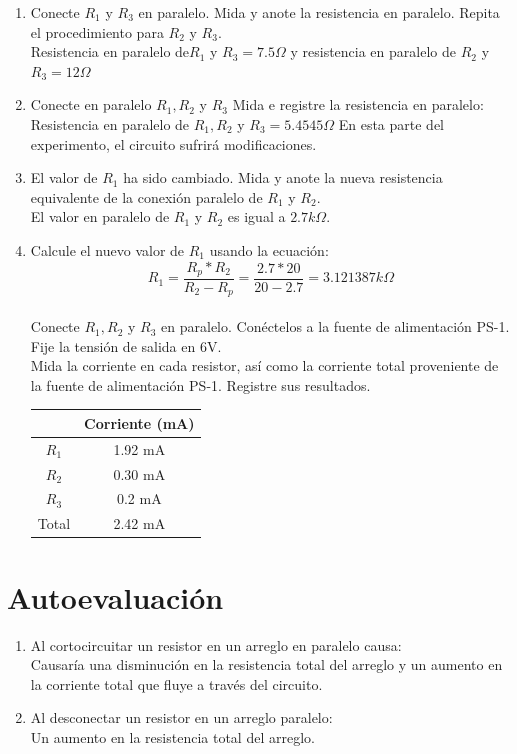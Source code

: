 \begin{enumerate}
	\item Conecte $R_{1}$ y $R_{3}$ en paralelo. Mida y anote la resistencia en paralelo. Repita el procedimiento para $R_{2}$ y $R_{3}$.
	\\
	Resistencia en paralelo de$R_{1}$ y $R_{3}=7.5\Omega$ y resistencia en paralelo de $R_{2}$ y $R_{3}=12\Omega$
	\item Conecte en paralelo $R_{1}, R_{2}$ y $R_{3}$ Mida e registre la resistencia en paralelo:
	\\
	Resistencia en paralelo de $R_{1}, R_{2}$ y $R_{3}=5.4545\Omega$
	En esta parte del experimento, el circuito sufrirá modificaciones. 
	\item El valor de $R_{1}$ ha sido cambiado. Mida y anote la nueva resistencia equivalente de la conexión paralelo de  $R_{1}$ y $R_{2}$.
	\\ El valor en paralelo de $R_{1}$ y $R_{2}$ es igual a $2.7k\Omega$.
	\item Calcule el nuevo valor de $R_{1}$ usando la ecuación: 
	\begin{equation*}
		R_{1}=\frac{R_{p}*R_{2}}{R_{2}-R_{p}}=\frac{2.7*20}{20-2.7}=3.121387k\Omega
	\end{equation*}
	\\
	Conecte $R_{1}, R_{2}$ y $R_{3}$ en paralelo. Conéctelos a la fuente de alimentación PS-1. Fije la tensión de salida en 6V.
	\\
	Mida la corriente en cada resistor, así como la corriente total proveniente de la fuente de alimentación PS-1. Registre sus resultados.
	\begin{table}[h]
		\centering
		\begin{tabular}{|c|c|}
			\hline
			&Corriente (mA)\\
			\hline
			$R_{1}$& 1.92 mA\\
			\hline
			$R_{2}$& 0.30 mA\\
			\hline
			$R_{3}$& 0.2 mA\\
			\hline
			Total&2.42 mA\\
			\hline
		\end{tabular}
	\end{table}
\end{enumerate}
\section{Autoevaluación}
\begin{enumerate}
	\item Al cortocircuitar un resistor en un arreglo en paralelo causa:
	\\
	Causaría una disminución en la resistencia total del arreglo y un aumento en la corriente total que fluye a través del circuito.
	\item Al desconectar un resistor en un arreglo paralelo:
	\\
	Un aumento en la resistencia total del arreglo. 
\end{enumerate}
